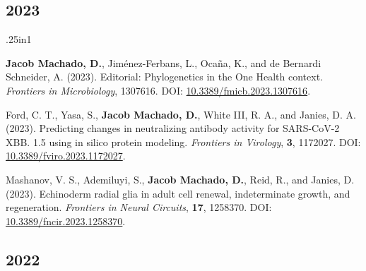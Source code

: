 \documentclass[11pt, letterpaper, sans]{moderncv}
\begin{document}

\subsection{2023}

	{\setlength{\parskip}{.5em}\renewcommand{\baselinestretch}{2.0}\begin{hangparas}{.25in}{1}

		\textbf{Jacob Machado, D.}, Jiménez-Ferbans, L., Ocaña, K., and de Bernardi Schneider, A. (2023). Editorial: Phylogenetics in the One Health context. \textit{Frontiers in Microbiology}, 1307616. DOI: \href{https://doi.org/10.3389/fmicb.2023.1307616}{10.3389/fmicb.2023.1307616}.

		Ford, C. T., Yasa, S., \textbf{Jacob Machado, D.}, White III, R. A., and Janies, D. A. (2023). Predicting changes in neutralizing antibody activity for SARS-CoV-2 XBB. 1.5 using in silico protein modeling. \textit{Frontiers in Virology}, \textbf{3}, 1172027. DOI: \href{https://doi.org/10.3389/fviro.2023.1172027}{10.3389/fviro.2023.1172027}.

		Mashanov, V. S., Ademiluyi, S., \textbf{Jacob Machado, D.}, Reid, R., and Janies, D. (2023). Echinoderm radial glia in adult cell renewal, indeterminate growth, and regeneration. \textit{Frontiers in Neural Circuits}, \textbf{17}, 1258370. DOI: \href{https://doi.org/10.3389/fncir.2023.1258370}{10.3389/fncir.2023.1258370}.

	\end{hangparas}}


\subsection{2022}
\end{document}
